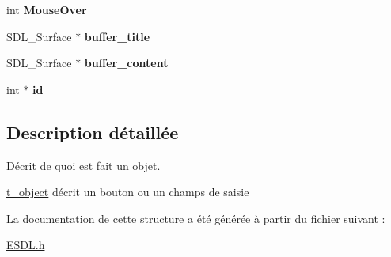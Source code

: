 \begin{DoxyCompactItemize}
\item 
\hypertarget{structt__object_aed9b974eedfad795d9af6ed45f1adc1b}{int {\bfseries Mouse\+Over}}\label{structt__object_aed9b974eedfad795d9af6ed45f1adc1b}

\item 
\hypertarget{structt__object_abcecffbbdc241c8ab9495e8fe9b8c5f7}{S\+D\+L\+\_\+\+Surface $\ast$ {\bfseries buffer\+\_\+title}}\label{structt__object_abcecffbbdc241c8ab9495e8fe9b8c5f7}

\item 
\hypertarget{structt__object_a83027f9b32164025c999067d134c2c66}{S\+D\+L\+\_\+\+Surface $\ast$ {\bfseries buffer\+\_\+content}}\label{structt__object_a83027f9b32164025c999067d134c2c66}

\item 
\hypertarget{structt__object_ac17c1f521bfe5798e72115835f845cc8}{int $\ast$ {\bfseries id}}\label{structt__object_ac17c1f521bfe5798e72115835f845cc8}

\end{DoxyCompactItemize}


\subsection{Description détaillée}
Décrit de quoi est fait un objet. 

\hyperlink{structt__object}{t\+\_\+object} décrit un bouton ou un champs de saisie 

La documentation de cette structure a été générée à partir du fichier suivant \+:\begin{DoxyCompactItemize}
\item 
\hyperlink{_e_s_d_l_8h}{E\+S\+D\+L.\+h}\end{DoxyCompactItemize}

